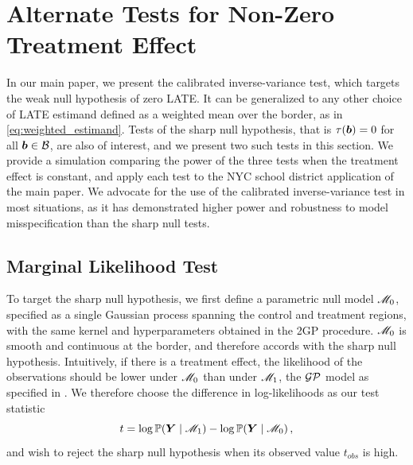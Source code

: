 \restoregeometry

\section{Alternate Tests for Non-Zero Treatment Effect}
\label{sec:alternate_tests}

	In our main paper, we present the calibrated inverse-variance test, which targets the weak null hypothesis of zero LATE.
It can be generalized to any other choice of LATE estimand defined as a weighted mean over the border, as in \autoref{eq:weighted_estimand}.
Tests of the sharp null hypothesis, that is \(\tau(\bm{b})=0\) for all \(\bm{b} \in \mathcal{B}\), are also of interest, and we present two such tests in this section.
We provide a simulation comparing the power of the three tests when the treatment effect is constant, and apply each test to the NYC school district application of the main paper.
We advocate for the use of the calibrated inverse-variance test in most situations, as it has demonstrated higher power and robustness to model misspecification than the sharp null tests.

\subsection{Marginal Likelihood Test}

	To target the sharp null hypothesis, we first define a parametric null model \(\mathscr{M}_0\),
specified as a single Gaussian process spanning the control and treatment regions,
with the same kernel and hyperparameters obtained in the 2GP procedure.
\(\mathscr{M}_0\) is smooth and continuous at the border,
and therefore accords with the sharp null hypothesis.
Intuitively, if there is a treatment effect,
the likelihood of the observations should be lower under \(\mathscr{M}_0\) than under \(\mathscr{M}_1\),
the \(\operatorname{\mathcal{GP}}\) model as specified in .
We therefore choose the difference in log-likelihoods as our test statistic
\begin{equation}
    t = \log \Pr\del{\Yvec \mid \modalt} - \log \Pr\del{\Yvec \mid \modnull} \,,
\end{equation}
and wish to reject the sharp null hypothesis when its observed value \(t_{obs}\) is high.

